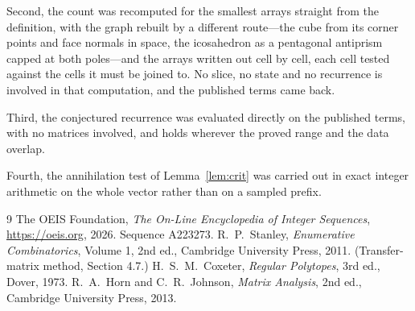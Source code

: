 \documentclass[11pt,a4paper]{article}
\theoremstyle{plain}
\theoremstyle{definition}
\begin{document}
Second, the count was recomputed for the smallest arrays straight from the definition, with the
graph rebuilt by a different route---the cube from its corner points and face normals in space,
the icosahedron as a pentagonal antiprism capped at both poles---and the arrays written out cell
by cell, each cell tested against the cells it must be joined to. No slice, no state and no
recurrence is involved in that computation, and the published terms came back.

Third, the conjectured recurrence was evaluated directly on the published terms, with no
matrices involved, and holds wherever the proved range and the data overlap.

Fourth, the annihilation test of Lemma~\ref{lem:crit} was carried out in exact integer
arithmetic on the whole vector rather than on a sampled prefix.

\begin{thebibliography}{9}
 The OEIS Foundation, \emph{The On-Line Encyclopedia of Integer
Sequences}, \url{https://oeis.org}, 2026. Sequence A223273.
 R.~P.~Stanley, \emph{Enumerative Combinatorics}, Volume 1, 2nd ed.,
Cambridge University Press, 2011. (Transfer-matrix method, Section 4.7.)
 H.~S.~M.~Coxeter, \emph{Regular Polytopes}, 3rd ed., Dover, 1973.
 R.~A.~Horn and C.~R.~Johnson, \emph{Matrix Analysis}, 2nd ed., Cambridge
University Press, 2013.
\end{thebibliography}
\end{document}

